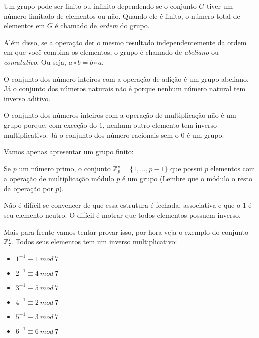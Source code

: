 Um grupo pode ser finito ou infinito dependendo se o conjunto $G$ tiver um número limitado de elementos ou não.
Quando ele é finito, o número total de elementos em $G$ é chamado de {\em ordem} do grupo.

Além disso, se a operação der o mesmo resultado independentemente da ordem em que você combina os elementos, o grupo é chamado de {\em abeliano} ou {\em comutativo}.
Ou seja, $a \circ b = b \circ a$.

O conjunto dos número inteiros com a operação de adição é um grupo abeliano.
Já o conjunto dos números naturais não é porque nenhum número natural tem inverso aditivo.

O conjunto dos números inteiros com a operação de multiplicação não é um grupo porque, com exceção do $1$, nenhum outro elemento tem inverso multiplicativo.
Já o conjunto dos número racionais sem o $0$ é um grupo.

Vamos apenas apresentar um grupo finito:
\begin{example}
  Se $p$ um número primo, o conjunto $\mathbb{Z}_p^\star = \{ 1, \dots, p-1\}$ que possui $p$ elementos com a operação de multiplicação módulo $p$ é um grupo (Lembre que o módulo o resto da operação por $p$).

    Não é difícil se convencer de que essa estrutura é fechada, associativa e que o $1$ é seu elemento neutro.
    O difícil é motrar que todos elementos possuem inverso.

    Mais para frente vamos tentar provar isso, por hora veja o exemplo do conjunto $\mathbb{Z}_7^\star$.
    Todos seus elementos tem um inverso multiplicativo:
    
    \begin{multicols}{2}
    \begin{itemize}
      \item[] $1^{-1} \equiv 1\ mod\ 7$
      \item[] $2^{-1} \equiv 4\ mod\ 7$
      \item[] $3^{-1} \equiv 5\ mod\ 7$
    \end{itemize}
    \begin{itemize}
      \item[] $4^{-1} \equiv 2\ mod\ 7$
      \item[] $5^{-1} \equiv 3\ mod\ 7$
      \item[] $6^{-1} \equiv 6\ mod\ 7$
    \end{itemize}
  \end{multicols}
\end{example}

